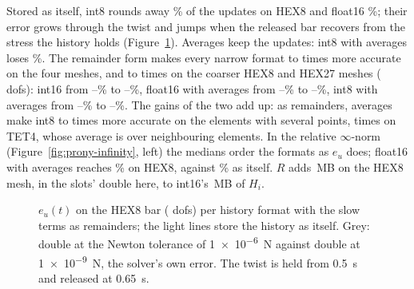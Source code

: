 \documentclass[sigconf,nonacm]{acmart}
\begin{document}
Stored as itself, int8 rounds away \hsLostIntHexF\% of the updates on HEX8 and float16
\hsLostHalfHexF\%; their error grows through the twist and jumps when the released bar recovers from
the stress the history holds (Figure~\ref{fig:prony-torsion}). Averages keep the updates: int8 with
averages loses \hsLostMdHexF\%. The remainder form makes every narrow format \hsRemGainMin{} to
\hsRemGainMax{} times more accurate on the four meshes, and \hsRemGainCoarseMin{} to
\hsRemGainCoarseMax{} times on the coarser HEX8 and HEX27 meshes (\hsDofsHexC{} dofs): int16 from
\hsTorsionSixteenPlainMin{}--\hsTorsionSixteenPlainMax\% to \hsTorsionSixteenMin{}--\hsTorsionSixteenMax\%,
float16 with averages from \hsTorsionHalfMdPlainMin{}--\hsTorsionHalfMdPlainMax\% to
\hsTorsionHalfMdMin{}--\hsTorsionHalfMdMax\%, int8 with averages from
\hsTorsionMdPlainMin{}--\hsTorsionMdPlainMax\% to \hsTorsionMdMin{}--\hsTorsionMdMax\%. The gains of the two
add up: as remainders, averages make int8 \hsTorsionMdGainMin{} to \hsTorsionMdGainMax{} times more
accurate on the elements with several points, \hsTorsionTetGain{} times on TET4, whose average is over
neighbouring elements. In the relative $\infty$-norm (Figure~\ref{fig:prony-infinity}, left) the
medians order the formats as $e_u$ does; float16 with averages reaches \hsInfMaxHalfMd\% on HEX8,
against \hsInfMaxHalfMdPlain\% as itself. $R$ adds \hsTorsionReferenceMB\,MB on the HEX8 mesh, in
the slots' double here, to int16's \hsTorsionSixteenMB\,MB of $H_i$.

\begin{table}
\caption{The bar in torsion on Grace: median $e_u$ against double storage per history format and
mesh (dofs), the history stored as itself ($H$) and with the slow terms as remainders ($G$); on
HEX8 the bytes of $H_i$ and $R$ with the remainders, and the share of the history updates the format
rounds away stored as itself. a.+d.: average and deviation.}
\label{tab:prony-torsion}
\small
\setlength{\tabcolsep}{3.5pt}

\end{table}

\begin{figure}[t]
\centering

\caption{$e_u(t)$ on the HEX8 bar (\hsDofsHexF{} dofs) per history format with the slow terms as
remainders; the light lines store the history as itself. Grey: double at the Newton tolerance of
\SI{1e-6}{\newton} against double at \SI{1e-9}{\newton}, the solver's own error. The twist is held from \SI{0.5}{\second}
and released at \SI{0.65}{\second}.}
\label{fig:prony-torsion}
\end{figure}
\end{document}
